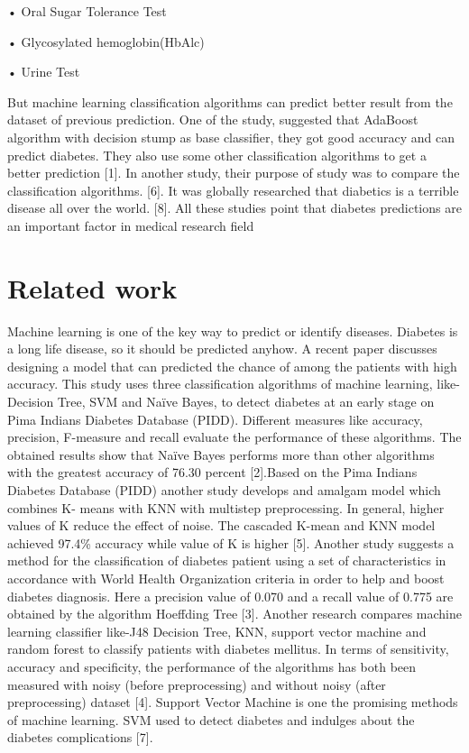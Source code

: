 \documentclass[conference]{IEEEtran}
\begin{document}
	•	Oral Sugar Tolerance Test
	
	•	Glycosylated hemoglobin(HbAlc)
	
	•	Urine Test
	
	But machine learning classification algorithms can predict better result from the dataset of previous prediction. One of the study, suggested that AdaBoost algorithm with decision stump as base classifier, they got good accuracy and can predict diabetes. They also use some other classification algorithms to get a better prediction [1]. In another study, their purpose of study was to compare the classification algorithms. [6]. It was globally researched that diabetics is a terrible disease all over the world. [8]. All these studies point that diabetes predictions are an important factor in medical research field
	
	
\section{Related work}
	Machine learning is one of the key way to predict or identify diseases. Diabetes is a long life disease, so it should be predicted anyhow. A recent paper discusses designing a model that can predicted the chance of among the patients with high accuracy. This study uses three classification algorithms of machine learning, like- Decision Tree, SVM and Naïve Bayes, to detect diabetes at an early stage on Pima Indians Diabetes Database (PIDD). Different measures like accuracy, precision, F-measure and recall evaluate the performance of these algorithms. The obtained results show that Naïve Bayes performs more than other algorithms with the greatest accuracy of 76.30 percent	[2].Based on the Pima Indians Diabetes Database (PIDD) another study develops and amalgam model which combines K- means with KNN with multistep preprocessing. In general, higher values of K reduce the effect of noise. The cascaded K-mean and KNN model achieved 97.4\% accuracy while value of K is higher [5]. Another study suggests a method for the classification of diabetes patient using a set of characteristics in accordance with World Health Organization criteria in order to help and boost diabetes diagnosis. Here a precision value of 0.070 and a recall value of 0.775 are obtained by the algorithm Hoeffding Tree [3]. Another research compares machine learning classifier like-J48 Decision Tree, KNN, support vector machine and random forest to classify patients with diabetes mellitus. In terms of sensitivity, accuracy and specificity, the performance of the algorithms has both been measured with noisy (before preprocessing) and without noisy (after preprocessing) dataset [4]. Support Vector Machine is one the promising methods of machine learning. SVM used to detect diabetes and indulges about the diabetes complications [7].
	
\end{document}
